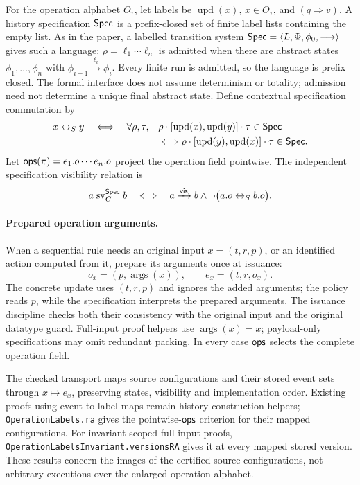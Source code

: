\begin{definition}
\label{def:history}
For the operation alphabet $O_\tau$, let labels be
$\operatorname{upd}(x)$, $x\in O_\tau$, and $(q\Rightarrow v)$.
A history specification $\mathsf{Spec}$ is a prefix-closed set of finite label lists
containing the empty list. As in the paper, a labelled transition system
$\mathsf{Spec}=\langle L,\Phi,\phi_0,\longrightarrow\rangle$ gives such a
language: $\rho=\ell_1\cdots\ell_n$ is admitted when there are abstract states
$\phi_1,\ldots,\phi_n$ with $\phi_{i-1}\xrightarrow{\ell_i}\phi_i$.
Every finite run is admitted, so the language is prefix closed.
The formal interface does not assume determinism or totality; admission need
not determine a unique final abstract state.
Define contextual specification commutation by
\begin{align*}
 x\mathrel{\mathrel{\leftrightarrow_{S}}}y\quad\Longleftrightarrow\quad
 \forall\rho,\tau,\quad
 &\rho\cdot[\operatorname{upd}(x),\operatorname{upd}(y)]\cdot\tau\in\mathsf{Spec}\\
 &\Longleftrightarrow
 \rho\cdot[\operatorname{upd}(y),\operatorname{upd}(x)]\cdot\tau\in\mathsf{Spec}.
\end{align*}
Let $\mathsf{ops}(\pi)=e_1.o\cdots e_n.o$ project the operation field
pointwise. The independent specification visibility relation is
\[
 a\mathrel{\operatorname{sv}^{\mathsf{Spec}}_C}b
 \quad\Longleftrightarrow\quad
 a\mathrel{\xrightarrow{\mathsf{vis}}} b\land\neg\bigl(a.o\mathrel{\leftrightarrow_{S}} b.o\bigr).
\]
\end{definition}

\paragraph{Prepared operation arguments.}
When a sequential rule needs an original input $x=(t,r,p)$, or an identified
action computed from it, prepare its arguments once at issuance:
\[
 o_x=(p,\operatorname{args}(x)),\qquad e_x=(t,r,o_x).
\]
The concrete update uses $(t,r,p)$ and ignores the added arguments; the
policy reads $p$, while the specification interprets the prepared arguments.
The issuance discipline checks both their consistency with the original input
and the original datatype guard. Full-input proof helpers use
$\operatorname{args}(x)=x$; payload-only specifications may omit redundant
packing. In every case $\mathsf{ops}$ selects the complete operation field.

The checked transport maps source configurations and their stored event sets
through $x\mapsto e_x$, preserving states, visibility and implementation
order. Existing proofs using event-to-label maps remain history-construction
helpers; \nolinkurl{OperationLabels.ra} gives the pointwise-$\mathsf{ops}$ criterion
for their mapped configurations. For invariant-scoped full-input proofs,
\nolinkurl{OperationLabelsInvariant.versionsRA} gives it at every mapped stored
version. These results concern the images of the certified source
configurations, not arbitrary executions over the enlarged operation alphabet.

